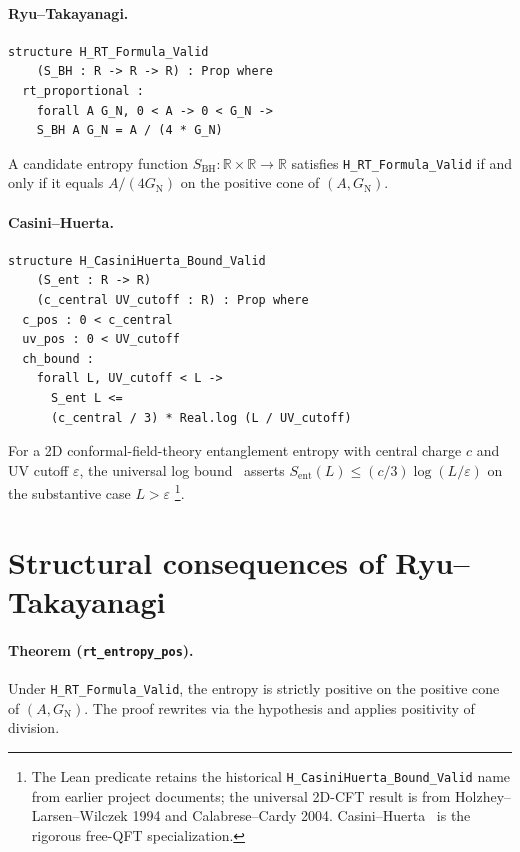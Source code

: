 \documentclass[twocolumn]{revtex4-2}
\newcommand{\GN}{G_{\mathrm{N}}}
\newcommand{\redArea}{A/(4\GN)}
\begin{document}
\paragraph{Ryu--Takayanagi.}
\begin{verbatim}
structure H_RT_Formula_Valid
    (S_BH : R -> R -> R) : Prop where
  rt_proportional :
    forall A G_N, 0 < A -> 0 < G_N ->
    S_BH A G_N = A / (4 * G_N)
\end{verbatim}
A candidate entropy function $S_{\mathrm{BH}} : \mathbb{R} \times
\mathbb{R} \to \mathbb{R}$ satisfies \texttt{H\_RT\_Formula\_Valid} if
and only if it equals $\redArea$ on the positive cone of
$(A, \GN)$.

\paragraph{Casini--Huerta.}
\begin{verbatim}
structure H_CasiniHuerta_Bound_Valid
    (S_ent : R -> R)
    (c_central UV_cutoff : R) : Prop where
  c_pos : 0 < c_central
  uv_pos : 0 < UV_cutoff
  ch_bound :
    forall L, UV_cutoff < L ->
      S_ent L <=
      (c_central / 3) * Real.log (L / UV_cutoff)
\end{verbatim}
For a 2D conformal-field-theory entanglement entropy with central
charge $c$ and UV cutoff $\varepsilon$, the universal log
bound~\cite{HolzheyLarsenWilczek1994,CalabreseCardy2004} asserts
$S_{\mathrm{ent}}(L) \le (c/3) \log(L / \varepsilon)$ on the
substantive case $L > \varepsilon$%
\footnote{\label{fn:ch-name}The Lean predicate retains the historical
\texttt{H\_CasiniHuerta\_Bound\_Valid} name from earlier project
documents; the universal 2D-CFT result is from Holzhey--Larsen--Wilczek
1994 and Calabrese--Cardy 2004. Casini--Huerta~\cite{CasiniHuerta2009}
is the rigorous free-QFT specialization.}.

\section{Structural consequences of Ryu--Takayanagi}
\label{sec:rt-consequences}

\paragraph*{Theorem (\texttt{rt\_entropy\_pos}).}
Under \texttt{H\_RT\_Formula\_Valid}, the entropy is strictly positive
on the positive cone of $(A, \GN)$. The proof rewrites via the
hypothesis and applies positivity of division.
\end{document}

